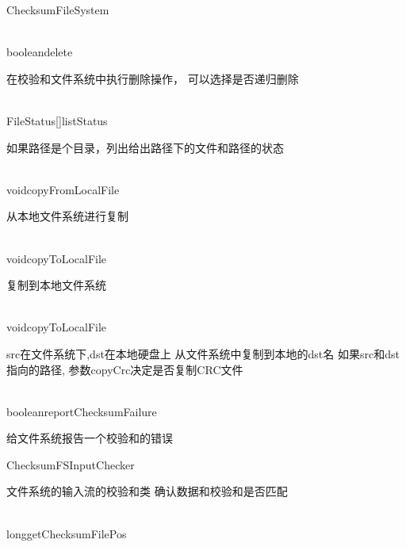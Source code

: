 \begin{XeClass}{ChecksumFileSystem}
  \begin{XeMethod}{\XePublic\\ }{boolean}{delete}
       
 在校验和文件系统中执行删除操作，
 可以选择是否递归删除

  \end{XeMethod}

  \begin{XeMethod}{\XePublic\\ }{FileStatus[]}{listStatus}
       
 如果路径是个目录，列出给出路径下的文件和路径的状态

  \end{XeMethod}

  \begin{XeMethod}{\XePublic\\ }{void}{copyFromLocalFile}
       
 从本地文件系统进行复制

  \end{XeMethod}

  \begin{XeMethod}{\XePublic\\ }{void}{copyToLocalFile}
       
 复制到本地文件系统

  \end{XeMethod}

  \begin{XeMethod}{\XePublic\\ }{void}{copyToLocalFile}
       
 src在文件系统下,dst在本地硬盘上
 从文件系统中复制到本地的dst名
 如果src和dst指向的路径, 参数copyCrc决定是否复制CRC文件

  \end{XeMethod}

  \begin{XeMethod}{\XePublic\\ }{boolean}{reportChecksumFailure}
       
 给文件系统报告一个校验和的错误

  \end{XeMethod}

  \begin{XeInnerClass}{ChecksumFSInputChecker}
     
 文件系统的输入流的校验和类
 确认数据和校验和是否匹配

    \begin{XeMethod}{\XePrivate\\ }{long}{getChecksumFilePos}
         

\end{XeMethod}
\end{XeInnerClass}
\end{XeClass}
